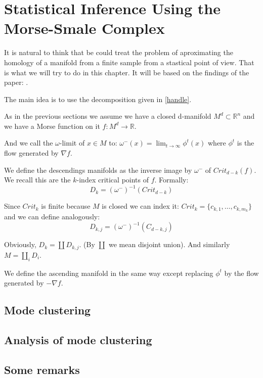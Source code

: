 \chapter{Statistical Inference Using the
Morse-Smale Complex}

It is natural to think that be could treat the problem
of aproximating the homology of a manifold from a finite 
sample from a stastical point of view. 
That is what we will try to do in this chapter. It will be based on the findings of the paper: \cite{che2017}.

The main idea is to use the decomposition given in \ref{handle}.

As in the previous sections we assume we have a closed d-manifold $M^d\subset \mathbb{R}^n$
and we have a Morse function on it $f:M^d\rightarrow \mathbb{R}$.

And we call the $\omega$-limit of $x\in M$ to:
$\omega^-(x)=\displaystyle\lim_{t\to \infty} \phi^t(x)$ where $\phi^t$ is 
the flow generated by $\nabla f$.

We define the descendings manifolds as the inverse image by $\omega^-$ of $Crit_{d-k}(f)$. 
We recall this are the $k$-index critical points of $f$.
Formally:
$$
D_k=
(\omega^-)^{-1}(Crit_{d-k})
$$

Since $Crit_k$ is finite because $M$ is closed we can index it:
$Crit_k=\{c_{k,1},\ldots,c_{k,m_k}\}$ and we can define analogously:
$$
D_{k,j}=
(\omega^-)^{-1}(C_{d-k,j})
$$

Obviously, $D_k=\coprod D_{k,j}$. (By $\coprod$ we mean disjoint union). And similarly
$M=\coprod_i D_i$.

We define the ascending manifold in the same way except replacing $\phi^t$ by the flow generated by $-\nabla f$.

\section{Mode clustering}


\section{Analysis of mode clustering}


\section{Some remarks}
